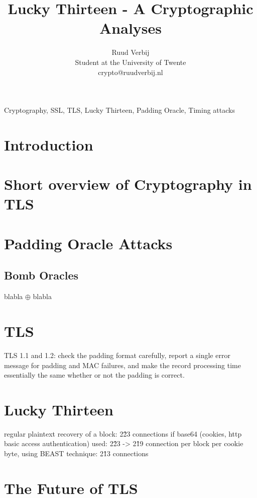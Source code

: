 \documentclass[10pt,conference,a4paper]{IEEEtran}
\title{Lucky Thirteen - A Cryptographic Analyses}
\author{Ruud Verbij \\ Student at the University of Twente \\ crypto@ruudverbij.nl}
\begin{document}
\maketitle

\begin{abstract}

\end{abstract}

\begin{IEEEkeywords}
Cryptography, SSL, TLS, Lucky Thirteen, Padding Oracle, Timing attacks
\end{IEEEkeywords}

\section{Introduction}
\label{sec:intro}

\section{Short overview of Cryptography in TLS}
\label{sec:crypto}

\section{Padding Oracle Attacks}

\label{sec:paddingoracle}
\subsection{}

\subsection{Bomb Oracles}
\label{sec:paddingoracle:bomb}
blabla $\oplus$ blabla

\section{TLS}
\label{sec:TLS}
TLS 1.1 and 1.2: check the padding format carefully, report a single error message for padding and MAC failures, and make the record processing time essentially the same whether or not the padding is correct.

\section{Lucky Thirteen}
\label{sec:lucky}
regular plaintext recovery of a block: 2\^23 connections
if base64 (cookies, http basic access authentication) used: 2\^23 -> 2\^19 connection per block
per cookie byte, using BEAST technique: 2\^13 connections

\section{The Future of TLS}
\label{sec:future}



\end{document}

